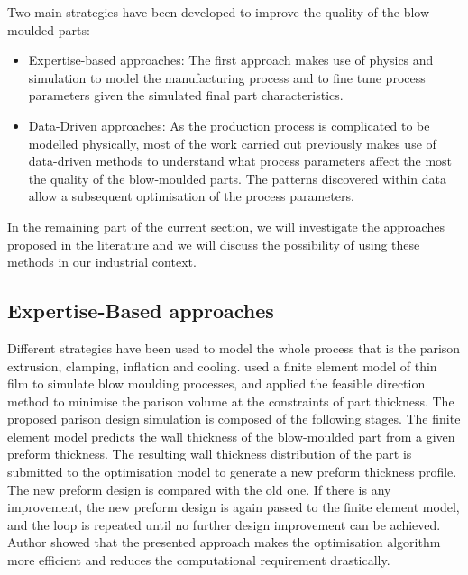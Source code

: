 Two main strategies have been developed to improve the quality of the blow-moulded parts:

\begin{itemize}
    \item Expertise-based approaches: The first approach makes use of physics and simulation to model the manufacturing process and to fine tune process parameters given the simulated final part characteristics. 
    \item Data-Driven approaches: As the production process is complicated to be modelled physically, most of the work carried out previously makes use of data-driven methods to understand what process parameters affect the most the quality of the blow-moulded parts. The patterns discovered within data allow a subsequent optimisation of the process parameters.
\end{itemize}


In the remaining part of the current section, we will investigate the approaches proposed in the literature and we will discuss the possibility of using these methods in our industrial context. 


\subsection{Expertise-Based approaches} \label{Expertise-based approaches}

Different strategies have been used to model the whole process that is the parison extrusion, clamping, inflation and cooling. \citet{lee1996prediction} used a finite element model of thin film to simulate blow moulding processes, and applied the feasible direction method to minimise the parison volume at the constraints of part thickness. The proposed parison design simulation is composed of the following stages. The finite element model predicts the wall thickness of the blow-moulded part from a given preform thickness. The resulting wall thickness distribution of the part is submitted to the optimisation model to generate a new preform thickness profile. The new preform design is compared with the old one. If there is any improvement, the new preform design is again passed to the finite element model, and the loop is repeated until no further design improvement can be achieved. Author showed that the presented approach makes the optimisation algorithm more efficient and reduces the computational requirement drastically. 

